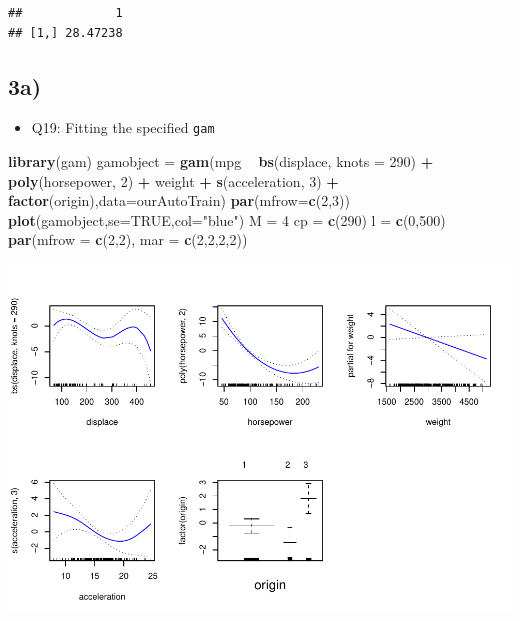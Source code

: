 \documentclass[]{article}
\newenvironment{Shaded}{\begin{snugshade}}{\end{snugshade}}
\newcommand{\KeywordTok}[1]{\textcolor[rgb]{0.13,0.29,0.53}{\textbf{#1}}}
\newcommand{\DataTypeTok}[1]{\textcolor[rgb]{0.13,0.29,0.53}{#1}}
\newcommand{\DecValTok}[1]{\textcolor[rgb]{0.00,0.00,0.81}{#1}}
\newcommand{\StringTok}[1]{\textcolor[rgb]{0.31,0.60,0.02}{#1}}
\newcommand{\OtherTok}[1]{\textcolor[rgb]{0.56,0.35,0.01}{#1}}
\newcommand{\OperatorTok}[1]{\textcolor[rgb]{0.81,0.36,0.00}{\textbf{#1}}}
\newcommand{\NormalTok}[1]{#1}
\providecommand{\tightlist}{%
  \setlength{\itemsep}{0pt}\setlength{\parskip}{0pt}}
\begin{document}
\begin{verbatim}
##             1
## [1,] 28.47238
\end{verbatim}

\subsection{3a)}\label{a-1}

\begin{itemize}
\tightlist
\item
  Q19: Fitting the specified \texttt{gam}
\end{itemize}

\begin{Shaded}
\begin{Highlighting}[]
\KeywordTok{library}\NormalTok{(gam)}
\NormalTok{gamobject =}\StringTok{ }\KeywordTok{gam}\NormalTok{(mpg }\OperatorTok{~}\StringTok{ }\KeywordTok{bs}\NormalTok{(displace, }\DataTypeTok{knots  =} \DecValTok{290}\NormalTok{) }\OperatorTok{+}\StringTok{ }\KeywordTok{poly}\NormalTok{(horsepower, }\DecValTok{2}\NormalTok{)  }\OperatorTok{+}\StringTok{ }\NormalTok{weight }\OperatorTok{+}\StringTok{ }\KeywordTok{s}\NormalTok{(acceleration, }\DecValTok{3}\NormalTok{) }\OperatorTok{+}\StringTok{ }\KeywordTok{factor}\NormalTok{(origin),}\DataTypeTok{data=}\NormalTok{ourAutoTrain)}
\KeywordTok{par}\NormalTok{(}\DataTypeTok{mfrow=}\KeywordTok{c}\NormalTok{(}\DecValTok{2}\NormalTok{,}\DecValTok{3}\NormalTok{))}
\KeywordTok{plot}\NormalTok{(gamobject,}\DataTypeTok{se=}\OtherTok{TRUE}\NormalTok{,}\DataTypeTok{col=}\StringTok{"blue"}\NormalTok{)}
\NormalTok{M =}\StringTok{ }\DecValTok{4}
\NormalTok{cp =}\StringTok{ }\KeywordTok{c}\NormalTok{(}\DecValTok{290}\NormalTok{)}
\NormalTok{l =}\StringTok{ }\KeywordTok{c}\NormalTok{(}\DecValTok{0}\NormalTok{,}\DecValTok{500}\NormalTok{)}
\KeywordTok{par}\NormalTok{(}\DataTypeTok{mfrow =} \KeywordTok{c}\NormalTok{(}\DecValTok{2}\NormalTok{,}\DecValTok{2}\NormalTok{), }\DataTypeTok{mar =} \KeywordTok{c}\NormalTok{(}\DecValTok{2}\NormalTok{,}\DecValTok{2}\NormalTok{,}\DecValTok{2}\NormalTok{,}\DecValTok{2}\NormalTok{))}
\end{Highlighting}
\end{Shaded}

\includegraphics{Project2_files/figure-latex/unnamed-chunk-10-1.pdf}
\end{document}
